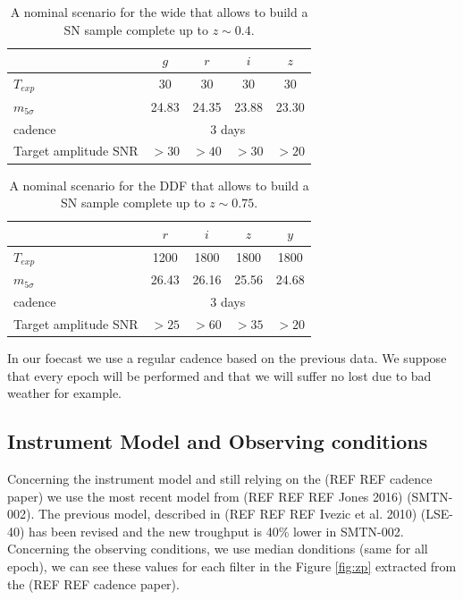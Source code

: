 \documentclass[\docopts]{\docclass}
\begin{document}
\begin{table}[t]
\begin{center}
\caption{A nominal scenario for the wide that allows to build a SN
  sample complete up to $z \sim 0.4$.}
\label{tab:nominal_scenario_wide}
\begin{tabular}{l|cccc}
\hline
\hline
              & $g$ & $r$ & $i$ & $z$ \\
\hline 
$T_{exp}$      & 30       &   30    &  30        & 30       \\
$m_{5\sigma}$  &  24.83   &  24.35   &  23.88    &  23.30   \\
cadence       &  \multicolumn{4}{c}{3 days} \\
Target amplitude SNR & $>30$ & $>40$ & $>30$ & $>20$ \\
\hline
\end{tabular}
\end{center}
\end{table}

\begin{table}[t]
\begin{center}
\caption{A nominal scenario for the DDF that allows to build a SN
  sample complete up to $z \sim 0.75$.}
\label{tab:nominal_scenario_DDF}
\begin{tabular}{l|cccc}
\hline
\hline
              & $r$ & $i$ & $z$ & $y$ \\
\hline 
$T_{exp}$      & 1200 & 1800 & 1800 & 1800 \\
$m_{5\sigma}$  & 26.43    & 26.16    &  25.56    &  24.68   \\
cadence       &  \multicolumn{4}{c}{3 days} \\
Target amplitude SNR & $>25$ & $>60$ & $>35$ & $>20$ \\
\hline
\end{tabular}
\end{center}
\end{table}

In our foecast we use a regular cadence based on the previous data. We suppose that every epoch will be performed and that we will suffer no lost due to bad weather for example.

\subsection{Instrument Model and Observing conditions}

Concerning the instrument model and still relying on the (REF REF cadence paper) we use the most recent model from (REF REF REF Jones 2016) (SMTN-002). The previous model, described in (REF REF REF Ivezic et al. 2010) (LSE-40) has been revised and the new troughput is 40\% lower  in SMTN-002.
Concerning the observing conditions, we use median donditions (same for all epoch), we can see these values for each filter in the Figure \ref{fig:zp} extracted from the (REF REF cadence paper).
\end{document}
